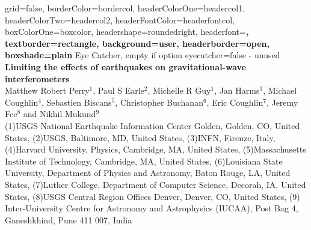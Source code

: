\documentclass[a0paper,portrait]{baposter}
\begin{document}
\begin{poster}{
	grid=false,
	borderColor=bordercol,
	headerColorOne=headercol1,
	headerColorTwo=headercol2,
	headerFontColor=headerfontcol,
	boxColorOne=boxcolor,
	headershape=roundedright,
	headerfont=\Large\sf\bf,
	textborder=rectangle,
	background=user,
	headerborder=open,
  boxshade=plain
}
{
	Eye Catcher, empty if option eyecatcher=false - unused
}
{   {\LARGE
}
}
{   {\large \bf
	Limiting the effects of earthquakes on gravitational-wave interferometers \\
	}
    {\small
	Matthew Robert Perry$^1$, Paul S Earle$^2$, Michelle R Guy$^1$, Jan Harms$^3$, Michael Coughlin$^4$, Sebastien Biscans$^5$, Christopher Buchanan$^6$, Eric Coughlin$^7$, Jeremy Fee$^8$ and Nikhil Mukund$^9$}\\
	{\tiny (1)USGS National Earthquake Information Center Golden, Golden, CO, United States, (2)USGS, Baltimore, MD, United States, (3)INFN, Firenze, Italy, (4)Harvard University, Physics, Cambridge, MA, United States, (5)Massachusetts Institute of Technology, Cambridge, MA, United States, (6)Louisiana State University, Department of Physics and Astronomy, Baton Rouge, LA, United States, (7)Luther College, Department of Computer Science, Decorah, IA, United States, (8)USGS Central Region Offices Denver, Denver, CO, United States, (9) Inter-University Centre for Astronomy and Astrophysics (IUCAA), Post Bag 4, Ganeshkhind, Pune 411 007, India
}
}
{
\setlength\fboxsep{0pt}
\setlength\fboxrule{0.5pt}
}


\end{poster}
\end{document}
